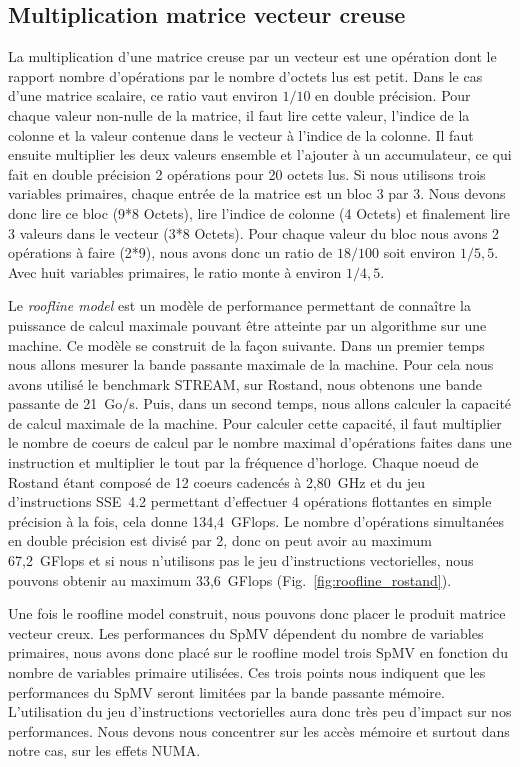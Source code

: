 \subsection{Multiplication matrice vecteur creuse}
La multiplication d'une matrice creuse par un vecteur est une opération dont le rapport nombre d'opérations par le nombre d'octets lus est petit.
%
Dans le cas d'une matrice scalaire, ce ratio vaut environ $1/10$ en double précision.
%
Pour chaque valeur non-nulle de la matrice, il faut lire cette valeur, l'indice de la colonne et la valeur contenue dans le vecteur à l'indice de la colonne.
%
Il faut ensuite multiplier les deux valeurs ensemble et l'ajouter à un accumulateur, ce qui fait en double précision 2 opérations pour 20 octets lus.
%
Si nous utilisons trois variables primaires, chaque entrée de la matrice est un bloc 3 par 3.
%
Nous devons donc lire ce bloc (9*8 Octets), lire l'indice de colonne (4 Octets) et finalement lire 3 valeurs dans le vecteur (3*8 Octets).
%
Pour chaque valeur du bloc nous avons 2 opérations à faire (2*9), nous avons donc un ratio de $18/100$ soit environ $1/5,5$.
%
Avec huit variables primaires, le ratio monte à environ $1/4,5$.

Le {\em roofline model} est un modèle de performance permettant de connaître la puissance de calcul maximale pouvant être atteinte par un algorithme sur une machine.
%
Ce modèle se construit de la façon suivante.
%
Dans un premier temps nous allons mesurer la bande passante maximale de la machine.
%
Pour cela nous avons utilisé le benchmark STREAM, sur Rostand, nous obtenons une bande passante de 21~Go/s.
%
Puis, dans un second temps, nous allons calculer la capacité de calcul maximale de la machine.
%
Pour calculer cette capacité, il faut multiplier le nombre de coeurs de calcul par le nombre maximal d'opérations faites dans une instruction et multiplier le tout par la fréquence d'horloge.
%
Chaque noeud de Rostand étant composé de 12 coeurs cadencés à 2,80~GHz et du jeu d'instructions SSE~4.2 permettant d'effectuer 4 opérations flottantes en simple précision à la fois, cela donne 134,4~GFlops.
%
Le nombre d'opérations simultanées en double précision est divisé par 2, donc on peut avoir au maximum 67,2~GFlops et si nous n'utilisons pas le jeu d'instructions vectorielles, nous pouvons obtenir au maximum 33,6~GFlops (Fig.~\ref{fig:roofline_rostand}).

Une fois le roofline model construit, nous pouvons donc placer le produit matrice vecteur creux.
%
Les performances du SpMV dépendent du nombre de variables primaires, nous avons donc placé sur le roofline model trois SpMV en fonction du nombre de variables primaire utilisées.
%
Ces trois points nous indiquent que les performances du SpMV seront limitées par la bande passante mémoire.
%
L'utilisation du jeu d'instructions vectorielles aura donc très peu d'impact sur nos performances.
%
Nous devons nous concentrer sur les accès mémoire et surtout dans notre cas, sur les effets NUMA.

